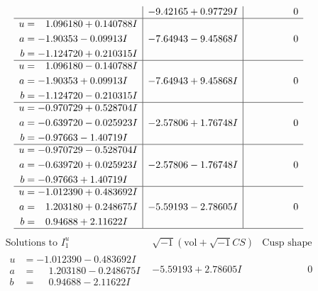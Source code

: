 \documentclass[1p]{elsarticle_modified}
\theoremstyle{definition}
\newcommand{\I}{\sqrt{-1}}
\begin{document}
$$\begin{array}{c|c|c}
 & -9.42165 + 0.97729 I & \phantom{-0.000000 } 0 \\ \hline\begin{aligned}
u &= \phantom{-}1.096180 + 0.140788 I \\
a &= -1.90353 - 0.09913 I \\
b &= -1.124720 + 0.210315 I\end{aligned}
 & -7.64943 - 9.45868 I & \phantom{-0.000000 } 0 \\ \hline\begin{aligned}
u &= \phantom{-}1.096180 - 0.140788 I \\
a &= -1.90353 + 0.09913 I \\
b &= -1.124720 - 0.210315 I\end{aligned}
 & -7.64943 + 9.45868 I & \phantom{-0.000000 } 0 \\ \hline\begin{aligned}
u &= -0.970729 + 0.528704 I \\
a &= -0.639720 - 0.025923 I \\
b &= -0.97663 - 1.40719 I\end{aligned}
 & -2.57806 + 1.76748 I & \phantom{-0.000000 } 0 \\ \hline\begin{aligned}
u &= -0.970729 - 0.528704 I \\
a &= -0.639720 + 0.025923 I \\
b &= -0.97663 + 1.40719 I\end{aligned}
 & -2.57806 - 1.76748 I & \phantom{-0.000000 } 0 \\ \hline\begin{aligned}
u &= -1.012390 + 0.483692 I \\
a &= \phantom{-}1.203180 + 0.248675 I \\
b &= \phantom{-}0.94688 + 2.11622 I\end{aligned}
 & -5.59193 - 2.78605 I & \phantom{-0.000000 } 0\\
 \hline 
 \end{array}$$\newpage$$\begin{array}{c|c|c}  
\text{Solutions to }I^u_{1}& \I (\text{vol} + \sqrt{-1}CS) & \text{Cusp shape}\\
 \hline 
\begin{aligned}
u &= -1.012390 - 0.483692 I \\
a &= \phantom{-}1.203180 - 0.248675 I \\
b &= \phantom{-}0.94688 - 2.11622 I\end{aligned}
 & -5.59193 + 2.78605 I & \phantom{-0.000000 } 0 \\ \hline\begin{aligned}

\end{aligned}
\end{array}$$
\end{document}
